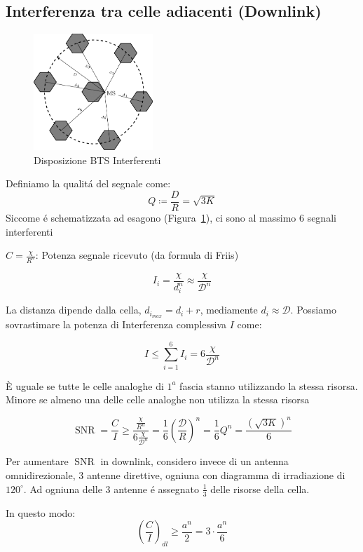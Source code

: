 \documentclass{article}
\DeclareMathOperator\snr{SNR}
\begin{document}
\subsection{Interferenza tra celle adiacenti (Downlink)}
\begin{figure}
    \includegraphics[width=0.4\textwidth]{img/sdt/bts_interferenti}
    \centering
    \caption{Disposizione BTS Interferenti\label{bti}}
\end{figure}

Definiamo la qualit\'a del segnale come:
\[ Q \coloneqq \frac{D}{R} = \sqrt{3K} \]
Siccome \'e schematizzata ad esagono (Figura~\ref{bti}), ci sono al massimo 6 segnali interferenti

$ C = \frac{\chi}{R^n}$: Potenza segnale ricevuto (da formula di Friis)

\[ I_i = \frac{\chi}{d_i^n} \approx \frac{\chi}{\mathcal{D}^n}\]

La distanza dipende dalla cella, $d_{i_{max}} = d_i + r$, mediamente $d_i \approx \mathcal{D}$. Possiamo sovrastimare la potenza di Interferenza complessiva $I$ come:

\[I \le \sum\limits^6_{i=1} I_i = 6\frac{\chi}{\mathcal{D}^n}\]

\`E uguale se tutte le celle analoghe di $1^a$ fascia stanno utilizzando la stessa risorsa. Minore se almeno una delle celle analoghe non utilizza la stessa risorsa

\[
    \snr=\frac{C}{I} \ge \frac{\frac{\chi}{R^n}}{6\frac{\chi}{\mathcal{D}^n}} =
    \frac{1}{6}{\left(\frac{\mathcal{D}}{R}\right)}^n =
    \frac{1}{6}Q^n = \frac{{(\sqrt{3K})}^n}{6}
\]

Per aumentare $\snr$ in downlink, considero invece di un antenna omnidirezionale, 3 antenne direttive, ogniuna con diagramma di irradiazione di $120^\circ$. Ad ogniuna delle 3 antenne \'e assegnato $\frac{1}{3}$ delle risorse della cella.

In questo modo:
\[ {\left(\frac{C}{I}\right)}_{dl}  \ge \frac{a^n}{2} = 3\cdot\frac{a^n}{6}\]
\end{document}
